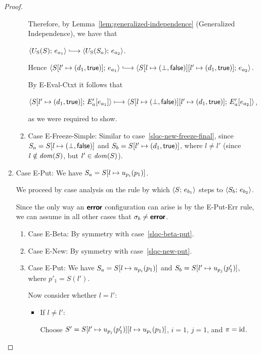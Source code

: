 \begin{proof}
\begin{enumerate}
\begin{enumerate}
      Therefore, by Lemma~\ref{lem:generalized-independence}
      (Generalized Independence), we have that

      $\config{\Ustore(S)}{e_{a_1}} \parstepsto
      \config{\Ustore(S_a)}{e_{a_2}}$.

      Hence $\config{\extS{S}{l'}{d_1}{\frozentrue}}{e_{a_1}}
      \parstepsto
      \config{\extS{\extS{S}{l}{\bot}{\frozenfalse}}{l'}{d_1}{\frozentrue}}{e_{a_2}}$.

      By {\sc E-Eval-Ctxt} it follows that

      $\langle S[l' \mapsto (d_1, \textsf{true})];\, E'_a\hspace{-0.5mm}\left[e_{a_1}\right] \rangle
      \longmapsto
      \langle S[l \mapsto (\bot, \textsf{false})][l' \mapsto (d_1, \textsf{true})];\, E'_a\hspace{-0.5mm}\left[e_{a_2}\right] \rangle$,

      as we were required to show.

    \item \label{slqc-new-freeze-simple}Case {\sc E-Freeze-Simple}:
      Similar to case~\ref{slqc-new-freeze-final}, since $S_a =
      S[l \mapsto (\bot, \textsf{false})]$ and $S_b =
      S[l' \mapsto (d_1, \textsf{true})]$, where $l \neq l'$ (since $l
      \notin \mathit{dom}(S)$, but $l' \in \mathit{dom}(S)$).

    \end{enumerate}
  \item Case {\sc E-Put}: We have $S_a =
    S[l \mapsto u_{p_i}(p_1)]$.

    We proceed by case analysis on the rule by which
    $\langle S;\, e_{b_1} \rangle$ steps to $\langle S_b;\, e_{b_2} \rangle$.

    Since the only way an $\textbf{\textsf{error}}$ configuration can arise is by the
    {\sc E-Put-Err} rule, we can assume in all other cases that
    $\sigma_b \neq \textbf{\textsf{error}}$.
    \begin{enumerate}
    \item \label{slqc-put-beta}Case {\sc E-Beta}: By symmetry with case~\ref{slqc-beta-put}.
    \item \label{slqc-put-new}Case {\sc E-New}: By symmetry with case~\ref{slqc-new-put}.
    \item \label{slqc-put-put}Case {\sc E-Put}: We have $S_a =
      S[l \mapsto u_{p_i}(p_1)]$ and $S_b =
      S[l' \mapsto u_{p_j}(p'_1)]$, where $p'_1 = S(l')$.

      Now consider whether $l = l'$:
      \begin{itemize}
      \item If $l \neq l'$:

        Choose $S' =
        S[l' \mapsto u_{p_j}(p'_1)][l \mapsto u_{p_i}(p_1)]$,
        $i = 1$, $j = 1$, and $\pi = \mathrm{id}$.


\end{itemize}
\end{enumerate}
\end{enumerate}
\end{proof}
